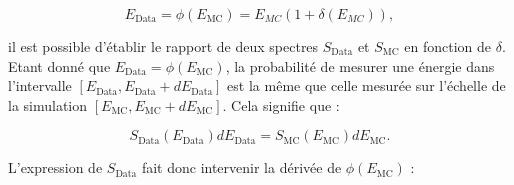 
\begin{equation}
    E_\textrm{Data} = \phi(E_\textrm{MC}) = E_{MC}\left( 1 + \delta(E_{MC}) \right),
\end{equation}

\bigbreak

il est possible d'établir le rapport de deux spectres $S_\textrm{Data}$ et $S_\textrm{MC}$ en fonction de $\delta$. Etant donné que $E_\textrm{Data} = \phi(E_\textrm{MC})$, la probabilité de mesurer une énergie dans l'intervalle $[E_\textrm{Data}, E_\textrm{Data} + dE_\textrm{Data} ]$ est la même que celle mesurée sur l'échelle de la simulation $[E_\textrm{MC}, E_\textrm{MC} + dE_\textrm{MC} ]$. Cela signifie que :

\begin{equation}
    S_\textrm{Data}(E_\textrm{Data}) dE_\textrm{Data} = S_\textrm{MC}(E_\textrm{MC}) dE_\textrm{MC}.
\end{equation}

\bigbreak

L'expression de $S_\textrm{Data}$ fait donc intervenir la dérivée de $\phi(E_\textrm{MC})$ :

